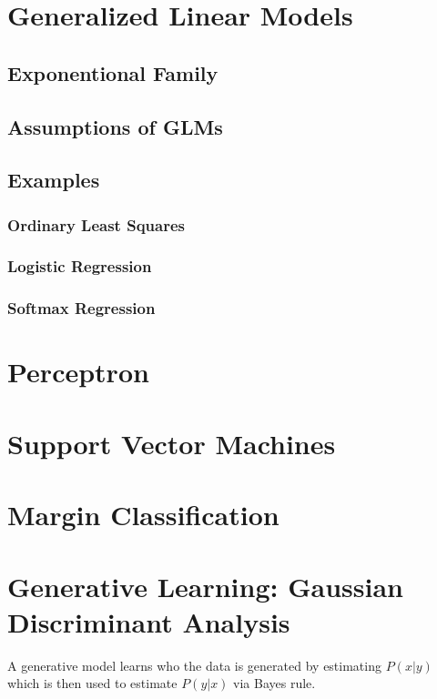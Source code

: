 \documentclass[twoside,twocolumn]{article}
\begin{document}
\section{Generalized Linear Models}
\subsection{Exponentional Family}
\subsection{Assumptions of GLMs}
\subsection{Examples}
\subsubsection{Ordinary Least Squares}
\subsubsection{Logistic Regression}
\subsubsection{Softmax Regression}
\section{Perceptron}
\section{Support Vector Machines}
\section{Margin Classification}
\section{Generative Learning: Gaussian Discriminant Analysis}
A generative model learns who the data is generated by estimating $P(x|y)$
which is then used to estimate $P(y|x)$ via Bayes rule.
\end{document}
